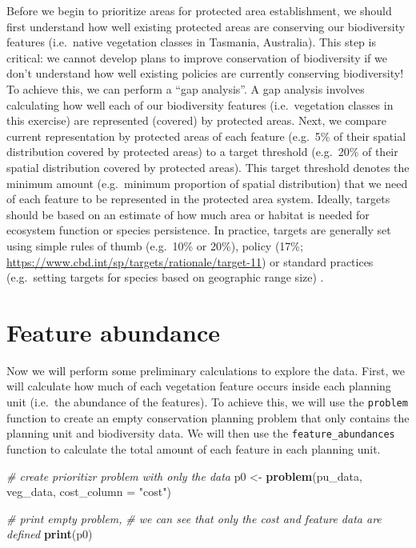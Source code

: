 \documentclass[
  12pt,
]{book}
\newenvironment{Shaded}{\begin{snugshade}}{\end{snugshade}}
\newcommand{\CommentTok}[1]{\textcolor[rgb]{0.56,0.35,0.01}{\textit{#1}}}
\newcommand{\DataTypeTok}[1]{\textcolor[rgb]{0.13,0.29,0.53}{#1}}
\newcommand{\KeywordTok}[1]{\textcolor[rgb]{0.13,0.29,0.53}{\textbf{#1}}}
\newcommand{\NormalTok}[1]{#1}
\newcommand{\StringTok}[1]{\textcolor[rgb]{0.31,0.60,0.02}{#1}}
\begin{document}
Before we begin to prioritize areas for protected area establishment, we should first understand how well existing protected areas are conserving our biodiversity features (i.e.~native vegetation classes in Tasmania, Australia). This step is critical: we cannot develop plans to improve conservation of biodiversity if we don't understand how well existing policies are currently conserving biodiversity! To achieve this, we can perform a ``gap analysis''. A gap analysis involves calculating how well each of our biodiversity features (i.e.~vegetation classes in this exercise) are represented (covered) by protected areas. Next, we compare current representation by protected areas of each feature (e.g.~5\% of their spatial distribution covered by protected areas) to a target threshold (e.g.~20\% of their spatial distribution covered by protected areas). This target threshold denotes the minimum amount (e.g.~minimum proportion of spatial distribution) that we need of each feature to be represented in the protected area system. Ideally, targets should be based on an estimate of how much area or habitat is needed for ecosystem function or species persistence. In practice, targets are generally set using simple rules of thumb (e.g.~10\% or 20\%), policy (17\%; \url{https://www.cbd.int/sp/targets/rationale/target-11}) or standard practices (e.g.~setting targets for species based on geographic range size) \citep{r1, r2}.

\hypertarget{feature-abundance}{%
\section{Feature abundance}\label{feature-abundance}}

Now we will perform some preliminary calculations to explore the data. First, we will calculate how much of each vegetation feature occurs inside each planning unit (i.e.~the abundance of the features). To achieve this, we will use the \texttt{problem} function to create an empty conservation planning problem that only contains the planning unit and biodiversity data. We will then use the \texttt{feature\_abundances} function to calculate the total amount of each feature in each planning unit.

\begin{Shaded}
\begin{Highlighting}[]
\CommentTok{# create prioritizr problem with only the data}
\NormalTok{p0 <-}\StringTok{ }\KeywordTok{problem}\NormalTok{(pu_data, veg_data, }\DataTypeTok{cost_column =} \StringTok{"cost"}\NormalTok{)}

\CommentTok{# print empty problem,}
\CommentTok{# we can see that only the cost and feature data are defined}
\KeywordTok{print}\NormalTok{(p0)}
\end{Highlighting}
\end{Shaded}
\end{document}
